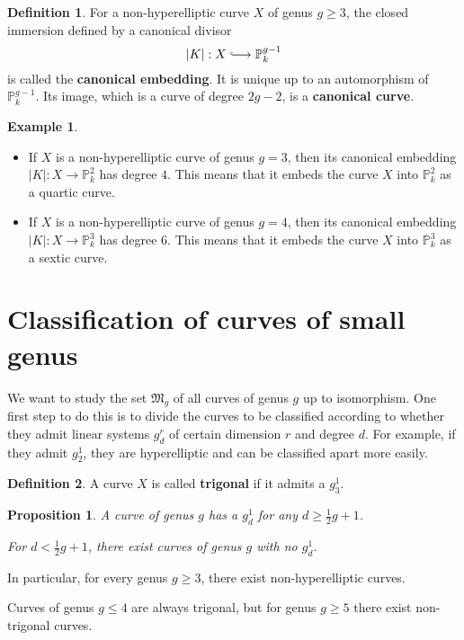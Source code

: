 \documentclass[12pt]{article}
\newtheorem*{proposition}{Proposition}
\theoremstyle{definition}
\newtheorem*{definition}{Definition}
\newtheorem*{example}{Example}
\begin{document}
\begin{definition}
For a non-hyperelliptic curve $X$ of genus $g\geq3$, the closed immersion defined by a canonical divisor
\[|K|:X\lhook\joinrel\longrightarrow\mathbb{P}_k^{g-1}\]
is called the \textbf{canonical embedding}. It is unique up to an automorphism of $\mathbb{P}_k^{g-1}$. Its image, which is a curve of degree $2g-2$, is a \textbf{canonical curve}.
\end{definition}

\begin{example}
\begin{itemize}
\item If $X$ is a non-hyperelliptic curve of genus $g=3$, then its canonical embedding $|K|:X\rightarrow\mathbb{P}_k^2$ has degree $4$. This means that it embeds the curve $X$ into $\mathbb{P}_k^2$ as a quartic curve.

\item If $X$ is a non-hyperelliptic curve of genus $g=4$, then its canonical embedding $|K|:X\rightarrow\mathbb{P}_k^3$ has degree $6$. This means that it embeds the curve $X$ into $\mathbb{P}_k^3$ as a sextic curve.
\end{itemize}
\end{example}

\section{Classification of curves of small genus}
We want to study the set $\mathfrak{M}_g$ of all curves of genus $g$ up to isomorphism. One first step to do this is to divide the curves to be classified according to whether they admit linear systems $g_d^r$ of certain dimension $r$ and degree $d$. For example, if they admit $g_2^1$, they are hyperelliptic and can be classified apart more easily.

\begin{definition}
A curve $X$ is called \textbf{trigonal} if it admits a $g_3^1$.
\end{definition}

\begin{proposition}
A curve of genus $g$ has a $g_d^1$ for any $d\geq\frac{1}{2}g+1$.

For $d<\frac{1}{2}g+1$, there exist curves of genus $g$ with no $g_d^1$.
\end{proposition}

In particular, for every genus $g\geq3$, there exist non-hyperelliptic curves.

Curves of genus $g\leq4$ are always trigonal, but for genus $g\geq5$ there exist non-trigonal curves.
\end{document}

